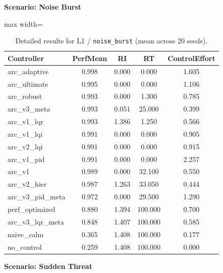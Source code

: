 \documentclass{article}
\newcommand{\scenarioheader}[1]{\Needspace{20\baselineskip}\textbf{Scenario: #1}}
\begin{document}
\scenarioheader{Noise Burst}

\begin{table}[H]
\centering
\footnotesize
\caption{Detailed results for L1 / \texttt{noise\_burst} (mean across 20 seeds).}
\label{tab:g2_noise_burst}
\begin{adjustbox}{max width=\textwidth}
\begin{tabular}{@{}lcccc@{}}
\toprule
Controller & PerfMean & RI & RT & ControlEffort \\ \midrule
arc\_adaptive & 0.998 & 0.000 & 0.000 & 1.605 \\
arc\_ultimate & 0.995 & 0.000 & 0.000 & 1.106 \\
arc\_robust & 0.993 & 0.000 & 1.300 & 0.785 \\
arc\_v3\_meta & 0.993 & 0.051 & 25.000 & 0.399 \\
arc\_v1\_lqr & 0.993 & 1.386 & 1.250 & 0.566 \\
arc\_v1\_lqi & 0.991 & 0.000 & 0.000 & 0.905 \\
arc\_v2\_lqi & 0.991 & 0.000 & 0.000 & 0.915 \\
arc\_v1\_pid & 0.991 & 0.000 & 0.000 & 2.257 \\
arc\_v1 & 0.989 & 0.000 & 32.100 & 0.550 \\
arc\_v2\_hier & 0.987 & 1.263 & 33.050 & 0.444 \\
arc\_v3\_pid\_meta & 0.972 & 0.000 & 29.500 & 1.290 \\
perf\_optimized & 0.880 & 1.394 & 100.000 & 0.700 \\
arc\_v3\_lqr\_meta & 0.848 & 1.407 & 100.000 & 0.585 \\
naive\_calm & 0.365 & 1.408 & 100.000 & 0.177 \\
no\_control & 0.259 & 1.408 & 100.000 & 0.000 \\ \bottomrule
\end{tabular}
\end{adjustbox}
\end{table}

\scenarioheader{Sudden Threat}
\end{document}
